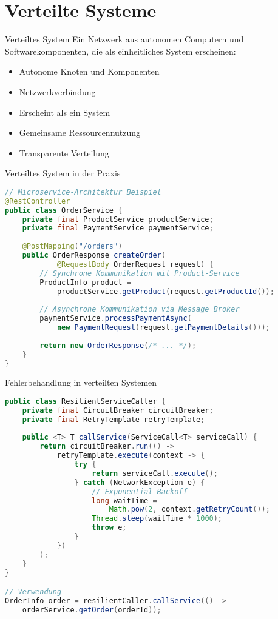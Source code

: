 \section{Verteilte Systeme}

\begin{definition}{Verteiltes System}
Ein Netzwerk aus autonomen Computern und Softwarekomponenten, die als einheitliches System erscheinen:
\begin{itemize}
    \item Autonome Knoten und Komponenten
    \item Netzwerkverbindung
    \item Erscheint als ein System
    \item Gemeinsame Ressourcennutzung
    \item Transparente Verteilung
\end{itemize}
\end{definition}

\begin{example}{Verteiltes System in der Praxis}
\begin{lstlisting}[language=Java]
// Microservice-Architektur Beispiel
@RestController
public class OrderService {
    private final ProductService productService;
    private final PaymentService paymentService;
    
    @PostMapping("/orders")
    public OrderResponse createOrder(
            @RequestBody OrderRequest request) {
        // Synchrone Kommunikation mit Product-Service
        ProductInfo product = 
            productService.getProduct(request.getProductId());
            
        // Asynchrone Kommunikation via Message Broker
        paymentService.processPaymentAsync(
            new PaymentRequest(request.getPaymentDetails()));
            
        return new OrderResponse(/* ... */);
    }
}
\end{lstlisting}
\end{example}

\begin{KR}{Fehlerbehandlung in verteilten Systemen}
\begin{lstlisting}[language=Java]
public class ResilientServiceCaller {
    private final CircuitBreaker circuitBreaker;
    private final RetryTemplate retryTemplate;
    
    public <T> T callService(ServiceCall<T> serviceCall) {
        return circuitBreaker.run(() -> 
            retryTemplate.execute(context -> {
                try {
                    return serviceCall.execute();
                } catch (NetworkException e) {
                    // Exponential Backoff
                    long waitTime = 
                        Math.pow(2, context.getRetryCount());
                    Thread.sleep(waitTime * 1000);
                    throw e;
                }
            })
        );
    }
}

// Verwendung
OrderInfo order = resilientCaller.callService(() ->
    orderService.getOrder(orderId));
\end{lstlisting}
\end{KR}

